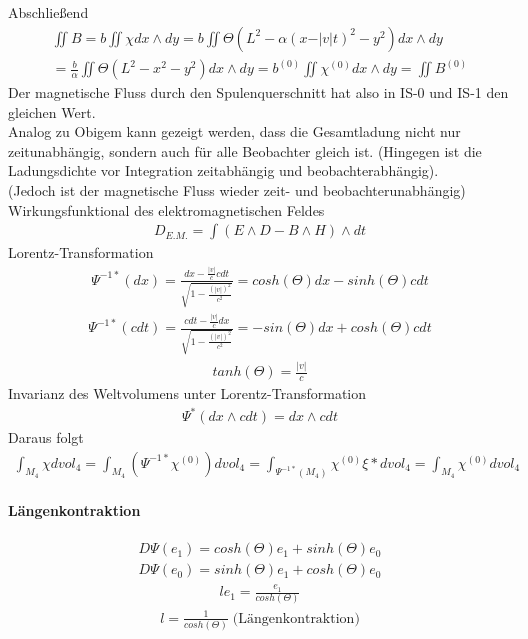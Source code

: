 \documentclass[10pt,a4paper]{article}
\begin{document}
Abschließend
\begin{align}
\iint B = b \iint \chi dx \wedge dy = b \iint \Theta (L^2- \alpha (x- \vert v \vert t)^2-y^2)dx \wedge dy\\ = \frac{b}{\alpha} \iint \Theta (L^2-x^2-y^2) dx \wedge dy = b^{(0)} \iint \chi^{(0)} dx \wedge dy = \iint B^{(0)}
\end{align}
Der magnetische Fluss durch den Spulenquerschnitt hat also in IS-0 und IS-1 den gleichen Wert. \\
Analog zu Obigem kann gezeigt werden, dass die Gesamtladung nicht nur zeitunabhängig, sondern auch für alle Beobachter gleich ist. (Hingegen ist die Ladungsdichte vor Integration zeitabhängig und beobachterabhängig).\\
(Jedoch ist der magnetische Fluss wieder zeit- und beobachterunabhängig)\\
Wirkungsfunktional des elektromagnetischen Feldes
\begin{align}
D_{E.M.} = \int (E \wedge D - B \wedge H) \wedge dt
\end{align}
Lorentz-Transformation
\begin{align}
\Psi^{-1*} (dx) =\frac{dx- \frac{\vert v \vert}{c} cdt}{\sqrt{1-\frac{(\vert v \vert)^2}{c^2}}} = cosh(\Theta) dx - sinh (\Theta) cdt
\end{align}
\begin{align}
\Psi ^{-1*} (cdt)= \frac{cdt- \frac{\vert v \vert}{c}dx}{\sqrt{1- \frac{(\vert v \vert)^2}{c^2}}}=-sin(\Theta) dx + cosh(\Theta) cdt
\end{align}
\begin{align}
tanh(\Theta)= \frac{\vert v \vert}{c}
\end{align}
Invarianz des Weltvolumens unter Lorentz-Transformation
\begin{align}
\Psi^* (dx \wedge cdt) = dx \wedge cdt
\end{align}
Daraus folgt
\begin{align}
\int_{M_4} \chi dvol_4 = \int_{M_4}  ( \Psi^{-1*} \chi^{(0)}) dvol_4 = \int_{ \Psi^{-1*} (M_4)} \chi^{(0)} \xi* dvol_4 = \int_{M_4} \chi^{(0)} dvol_4 
\end{align}
\paragraph{Längenkontraktion} $\,$ \\
\begin{align}
D \Psi (e_1) = cosh(\Theta) e_1 + sinh(\Theta) e_0
\end{align}
\begin{align}
D \Psi (e_0) = sinh(\Theta) e_1 + cosh( \Theta) e_0
\end{align}
\begin{align}
l e_1 = \frac{e_1}{cosh(\Theta)}
\end{align}
\begin{align}
l=\frac{1}{cosh(\Theta)} \;  \text{(Längenkontraktion)}
\end{align}
\end{document}
